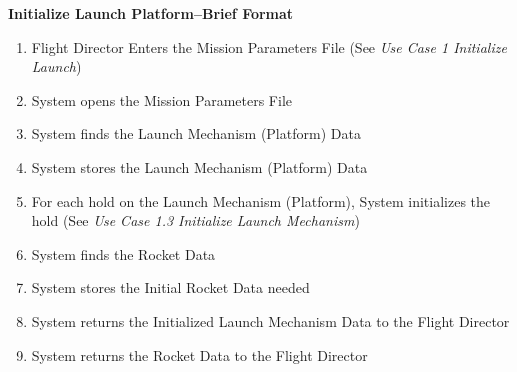 \documentclass[letterpaper]{article}
\begin{document}
\noindent
\textbf{Initialize Launch Platform--Brief Format}
\begin{enumerate}
   \item Flight Director Enters the Mission Parameters File (See
      \textit{Use Case 1 Initialize Launch})
   \item System opens the Mission Parameters File
   \item System finds the Launch Mechanism (Platform) Data
   \item System stores the Launch Mechanism (Platform) Data
   \item For each hold on the Launch Mechanism (Platform), System
      initializes the hold (See \textit{Use Case 1.3 Initialize 
      Launch Mechanism})
   \item System finds the Rocket Data
   \item System stores the Initial Rocket Data needed
   \item System returns the Initialized Launch Mechanism Data to the
      Flight Director
   \item System returns the Rocket Data to the Flight Director
\end{enumerate}
\end{document}
